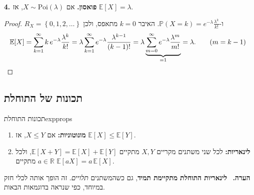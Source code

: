 \documentclass[11pt,a4paper]{report}
\newenvironment{remark}{\par\smallskip\noindent\textsf{\textbf{הערה.}}\ }{\par\smallskip}
\newcommand{\R}{\mathbb{R}}
\newcommand{\set}[1]{\left\{#1\right\}}
\newcommand{\PP}{\mathbb{P}}
\newcommand{\E}{\mathbb{E}}
\newcommand{\Poi}{\mathrm{Poi}}
\begin{document}
\textbf{4. פואסון.} אם $X\sim\Poi(\lambda)$, אז $\E[X]=\lambda$.
\begin{proof}
$R_X=\set{0,1,2,\dots}$ ו-$\PP(X=k)=e^{-\lambda}\frac{\lambda^k}{k!}$. האיבר $k=0$ מתאפס, ולכן
\[
  \E[X]=\sum_{k=1}^\infty k\,e^{-\lambda}\frac{\lambda^k}{k!}
  =\lambda\sum_{k=1}^\infty e^{-\lambda}\frac{\lambda^{k-1}}{(k-1)!}
  =\lambda\underbrace{\sum_{m=0}^\infty e^{-\lambda}\frac{\lambda^m}{m!}}_{=1}=\lambda.\qquad(m=k-1)\qedhere
\]
\end{proof}

\subsection{תכונות של התוחלת}

\begin{theorem}{תכונות התוחלת}{expprops}
\begin{enumerate}[label=(\alph*)]
  \item \textbf{מונוטוניות:} אם $X\le Y$, אז $\E[X]\le\E[Y]$.
  \item \textbf{לינאריות:} לכל שני משתנים מקריים $X,Y$ מתקיים $\E[X+Y]=\E[X]+\E[Y]$, ולכל $a\in\R$ מתקיים $\E[aX]=a\,\E[X]$.
\end{enumerate}
\end{theorem}

\begin{remark}
\textbf{לינאריות התוחלת מתקיימת תמיד}, גם כשהמשתנים \emph{תלויים}. זה הופך אותה לכלי חזק במיוחד, כפי שנראה בדוגמאות הבאות.
\end{remark}
\end{document}
